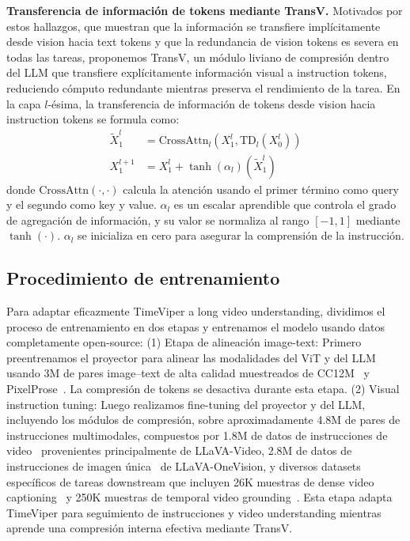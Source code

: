 \documentclass[10pt,twocolumn,letterpaper]{article}
\begin{document}
\noindent\textbf{Transferencia de información de tokens mediante TransV.}
Motivados por estos hallazgos, que muestran que la información se transfiere implícitamente desde vision hacia text tokens y que la redundancia de vision tokens es severa en todas las tareas, proponemos TransV, un módulo liviano de compresión dentro del LLM que transfiere explícitamente información visual a instruction tokens, reduciendo cómputo redundante mientras preserva el rendimiento de la tarea. 
En la capa $l$-ésima, la transferencia de información de tokens desde vision hacia instruction tokens se formula como:
\begin{equation}
    \begin{split}
        \tilde{X}_1^l &= \mathrm{CrossAttn}_l(X_1^l, \mathrm{TD}_l(X_0^l))    \\
        X_1^{l+1} &= X_1^l + \tanh(\alpha_l)(\tilde{X}_1^l)
    \end{split}
\end{equation}
donde $\mathrm{CrossAttn}(\cdot,\cdot)$ calcula la atención usando el primer término como query y el segundo como key y value. 
$\alpha_l$ es un escalar aprendible que controla el grado de agregación de información, y su valor se normaliza al rango $[-1,1]$ mediante $\tanh(\cdot)$. 
$\alpha_l$ se inicializa en cero para asegurar la comprensión de la instrucción.



\subsection{Procedimiento de entrenamiento}
\label{subsec:training}
Para adaptar eficazmente TimeViper a long video understanding, dividimos el proceso de entrenamiento en dos etapas y entrenamos el modelo usando datos completamente open-source:
(1) Etapa de alineación image-text: 
Primero preentrenamos el proyector para alinear las modalidades del ViT y del LLM usando 3M de pares image--text de alta calidad muestreados de CC12M~\cite{changpinyo2021cc12m} y PixelProse~\cite{singla2024pixelprose}. La compresión de tokens se desactiva durante esta etapa. 
(2) Visual instruction tuning: 
Luego realizamos fine-tuning del proyector y del LLM, incluyendo los módulos de compresión, sobre aproximadamente 4.8M de pares de instrucciones multimodales, compuestos por 1.8M de datos de instrucciones de video~\cite{sharegemini,bain2021webvid,carreira2017k400,zhang2025llavavideo,chen2024sharegpt4video,li2024videochatflash,song2024moviechat} provenientes principalmente de LLaVA-Video, 
2.8M de datos de instrucciones de imagen única~\cite{lillavaov} de LLaVA-OneVision, 
y diversos datasets específicos de tareas downstream que incluyen 
26K muestras de dense video captioning~\cite{caba2015activitynet,zhou2018youcook2,tang2019coin,zala2023hirest,huang2020vitt} y 
250K muestras de temporal video grounding~\cite{liu2024etbench,wang2025timer1,yang2023vid2seq,anne2017didemo,afouras2023htstep,miech2019howto100m,zeng2025timesuite,ren2024timechat,guo2025vtgllm,oncescu2021queryd,wang2024internvid}.
Esta etapa adapta TimeViper para seguimiento de instrucciones y video understanding mientras aprende una compresión interna efectiva mediante TransV.
\end{document}
